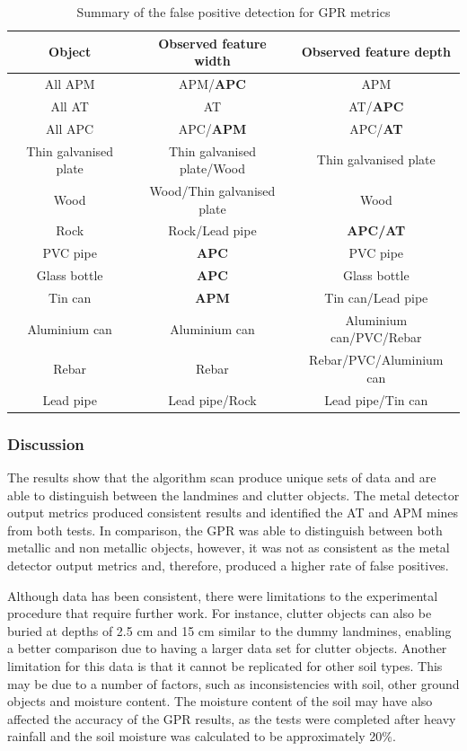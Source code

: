 \documentclass[main.tex]{subfiles}
\begin{document}
\begin{table}[!ht]
\centering
\caption{Summary of the false positive detection for GPR metrics}
\begin{tabular}{ccc}
\toprule
Object & Observed feature width & Observed feature depth \\ \midrule
All APM & APM/\textbf{APC} & APM \\
All AT & AT & AT/\textbf{APC} \\
All APC & APC/\textbf{APM} & APC/\textbf{AT} \\
Thin galvanised plate & Thin galvanised plate/Wood & Thin galvanised plate \\
Wood & Wood/Thin galvanised plate & Wood \\
Rock & Rock/Lead pipe & \textbf{APC/AT} \\
PVC pipe & \textbf{APC} & PVC pipe \\
Glass bottle & \textbf{APC} & Glass bottle \\
Tin can & \textbf{APM} & Tin can/Lead pipe \\
Aluminium can & Aluminium can & Aluminium can/PVC/Rebar \\
Rebar & Rebar & Rebar/PVC/Aluminium can \\
Lead pipe & Lead pipe/Rock & Lead pipe/Tin can\\ \bottomrule
\end{tabular}
\end{table}

\subsubsection{Discussion}
The results show that the algorithm scan produce unique sets of data and are able to distinguish between the landmines and clutter objects. The metal detector output metrics produced consistent results and identified the AT and APM mines from both tests. In comparison, the GPR was able to distinguish between both metallic and non metallic objects, however, it was not as consistent as the metal detector output metrics and, therefore, produced a higher rate of false positives.

Although data has been consistent, there were limitations to the experimental procedure that require further work. For instance, clutter objects can also be buried at depths of 2.5 cm and 15 cm similar to the dummy landmines, enabling a better comparison due to having a larger data set for clutter objects.
Another limitation for this data is that it cannot be replicated for other soil types. This may be due to a number of factors, such as inconsistencies with soil, other ground objects and moisture content. The moisture content of the soil may have also affected the accuracy of the GPR results, as the tests were completed after heavy rainfall and the soil moisture was calculated to be approximately 20\%. 
\end{document}
